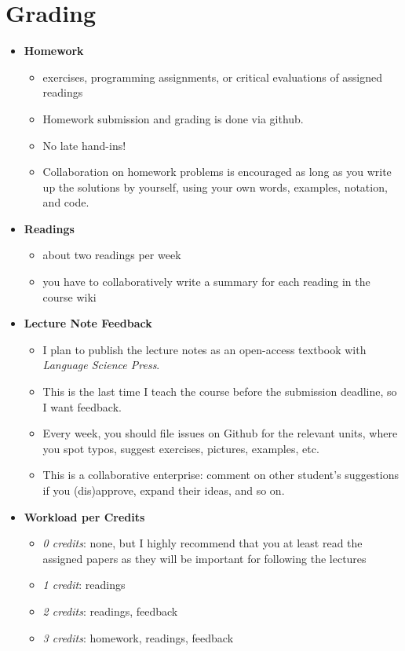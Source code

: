 \section{Grading}
\begin{itemize}
    \item \textbf{Homework}
        \begin{itemize}
            \item exercises, programming assignments, or critical evaluations of assigned readings
            \item Homework submission and grading is done via github.
            \item No late hand-ins!
            \item Collaboration on homework problems is encouraged as long as you write up the solutions by yourself, using your own words, examples, notation, and code.
        \end{itemize}
    \item \textbf{Readings}
        \begin{itemize}
            \item about two readings per week
            \item you have to collaboratively write a summary for each reading in the course wiki
        \end{itemize}
    \item \textbf{Lecture Note Feedback}
        \begin{itemize}
            \item I plan to publish the lecture notes as an open-access textbook with \emph{Language Science Press}.
            \item This is the last time I teach the course before the submission deadline, so I want feedback.
            \item Every week, you should file issues on Github for the relevant units, where you spot typos, suggest exercises, pictures, examples, etc.
            \item This is a collaborative enterprise: comment on other student's suggestions if you (dis)approve, expand their ideas, and so on.
        \end{itemize}
    \item \textbf{Workload per Credits}
        \begin{itemize}
            \item \emph{0 credits}: none, but I highly recommend that you at least read the assigned papers as they will be important for following the lectures
            \item \emph{1 credit}: readings
            \item \emph{2 credits}: readings, feedback
            \item \emph{3 credits}: homework, readings, feedback
        \end{itemize}
\end{itemize}


